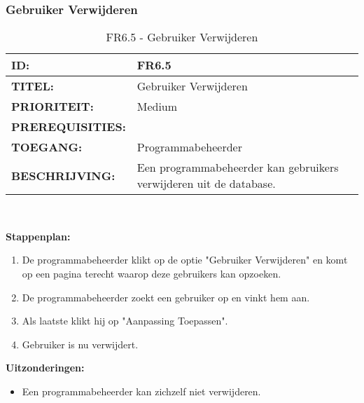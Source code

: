 \subsubsection{Gebruiker Verwijderen}
\noindent\begin{table}[H]
            \begin{tabular}{l | p{10cm}}
                \textbf{ID:} & FR6.5 \\ \hline
                \textbf{TITEL:} & Gebruiker Verwijderen \\ \hline
                \textbf{PRIORITEIT:} &  Medium \\ \hline
                \textbf{PREREQUISITIES:} & \\ \hline
                \textbf{TOEGANG:} & Programmabeheerder \\ \hline
                \textbf{BESCHRIJVING:} & Een programmabeheerder kan gebruikers verwijderen uit de database.\\
            \end{tabular}\\
            \caption{FR6.5 - Gebruiker Verwijderen }
            \label{tab:FR6.5 - Gebruiker Verwijderen }
        \end{table}   

\textbf{Stappenplan:}
	\begin{enumerate}
	\item De programmabeheerder klikt op de optie "Gebruiker Verwijderen" en komt op een pagina terecht waarop deze gebruikers kan opzoeken.
	\item De programmabeheerder zoekt een gebruiker op en vinkt hem aan.
	\item Als laatste klikt hij op "Aanpassing Toepassen".
	\item Gebruiker is nu verwijdert.
	\end{enumerate}	
	
\textbf{Uitzonderingen:}
\begin{itemize}
\item Een programmabeheerder kan zichzelf niet verwijderen.
\end{itemize}

\clearpage